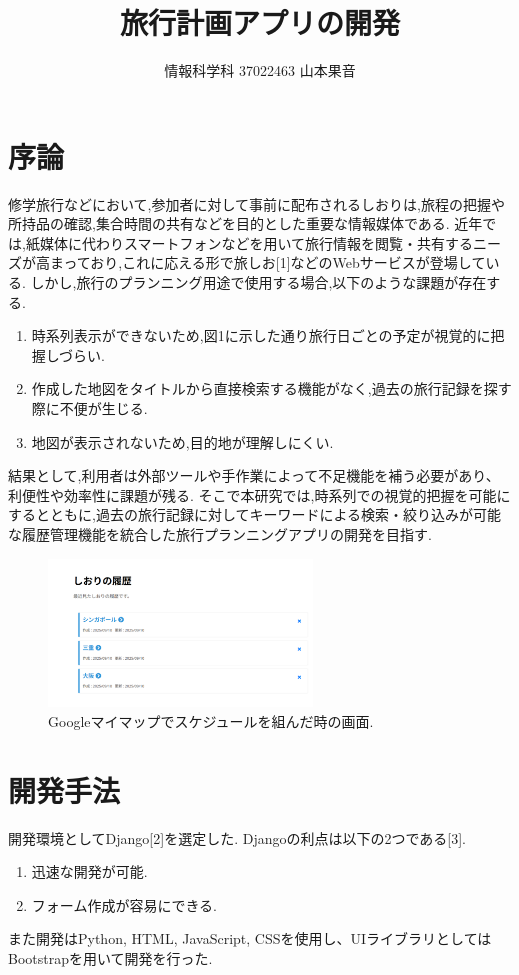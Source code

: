 \documentclass[a4j,twocolumn]{jsarticle}
\begin{document}
  \title{旅行計画アプリの開発}
  \author{情報科学科 \hspace{5mm} 37022463 \hspace{5mm} 山本果音}
  \date{}

  \maketitle


\section{序論}
\label{sec:org59b7a64}
修学旅行などにおいて,参加者に対して事前に配布されるしおりは,旅程の把握や所持品の確認,集合時間の共有などを目的とした重要な情報媒体である.
近年では,紙媒体に代わりスマートフォンなどを用いて旅行情報を閲覧・共有するニーズが高まっており,これに応える形で旅しお[1]などのWebサービスが登場している.
しかし,旅行のプランニング用途で使用する場合,以下のような課題が存在する.
\begin{enumerate}
\item 時系列表示ができないため,図1に示した通り旅行日ごとの予定が視覚的に把握しづらい.
\item 作成した地図をタイトルから直接検索する機能がなく,過去の旅行記録を探す際に不便が生じる.
\item 地図が表示されないため,目的地が理解しにくい.
\end{enumerate}
結果として,利用者は外部ツールや手作業によって不足機能を補う必要があり、利便性や効率性に課題が残る.
そこで本研究では,時系列での視覚的把握を可能にするとともに,過去の旅行記録に対してキーワードによる検索・絞り込みが可能な履歴管理機能を統合した旅行プランニングアプリの開発を目指す.


\begin{figure}[htbp]
\centering
\includegraphics[width=7cm]{./figs/rireki1.png}
\caption{\label{fig:orge864363}Googleマイマップでスケジュールを組んだ時の画面.}
\end{figure}


\section{開発手法}
\label{sec:orga20ecd7}
開発環境としてDjango[2]を選定した.
Djangoの利点は以下の2つである[3].
\begin{enumerate}
\item 迅速な開発が可能.
\item フォーム作成が容易にできる.
\end{enumerate}
また開発はPython, HTML, JavaScript, CSSを使用し、UIライブラリとしてはBootstrapを用いて開発を行った.
\end{document}
